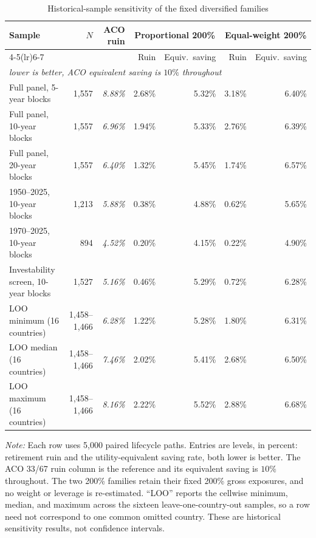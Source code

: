 \begin{table}[H]
\centering
\caption{Historical-sample sensitivity of the fixed diversified families}
\label{tab:historical-uncertainty}
\scriptsize\setlength{\tabcolsep}{3pt}
\begin{tabular}{lrrrrrr}
\toprule
Sample & $N$ & ACO ruin & \multicolumn{2}{c}{Proportional 200\%} & \multicolumn{2}{c}{Equal-weight 200\%} \\
\cmidrule(lr){4-5}\cmidrule(lr){6-7}
 & & & Ruin & Equiv.\ saving & Ruin & Equiv.\ saving \\
\multicolumn{7}{l}{\emph{lower is better, ACO equivalent saving is $10\%$ throughout}} \\
\midrule
Full panel, 5-year blocks & 1{,}557 & \emph{8.88\%} & 2.68\% & 5.32\% & 3.18\% & 6.40\% \\
Full panel, 10-year blocks & 1{,}557 & \emph{6.96\%} & 1.94\% & 5.33\% & 2.76\% & 6.39\% \\
Full panel, 20-year blocks & 1{,}557 & \emph{6.40\%} & 1.32\% & 5.45\% & 1.74\% & 6.57\% \\
1950--2025, 10-year blocks & 1{,}213 & \emph{5.88\%} & 0.38\% & 4.88\% & 0.62\% & 5.65\% \\
1970--2025, 10-year blocks & 894 & \emph{4.52\%} & 0.20\% & 4.15\% & 0.22\% & 4.90\% \\
Investability screen, 10-year blocks & 1{,}527 & \emph{5.16\%} & 0.46\% & 5.29\% & 0.72\% & 6.28\% \\
LOO minimum (16 countries) & 1{,}458--1{,}466 & \emph{6.28\%} & 1.22\% & 5.28\% & 1.80\% & 6.31\% \\
LOO median (16 countries) & 1{,}458--1{,}466 & \emph{7.46\%} & 2.02\% & 5.41\% & 2.68\% & 6.50\% \\
LOO maximum (16 countries) & 1{,}458--1{,}466 & \emph{8.16\%} & 2.22\% & 5.52\% & 2.88\% & 6.68\% \\
\bottomrule
\end{tabular}
\begin{minipage}{0.97\textwidth}\footnotesize
\textit{Note:} Each row uses 5{,}000 paired lifecycle paths. Entries are levels, in percent: retirement ruin and the utility-equivalent saving rate, both lower is better. The ACO 33/67 ruin column is the reference and its equivalent saving is $10\%$ throughout. The two 200\% families retain their fixed 200\% gross exposures, and no weight or leverage is re-estimated. ``LOO'' reports the cellwise minimum, median, and maximum across the sixteen leave-one-country-out samples, so a row need not correspond to one common omitted country. These are historical sensitivity results, not confidence intervals.
\end{minipage}
\end{table}
